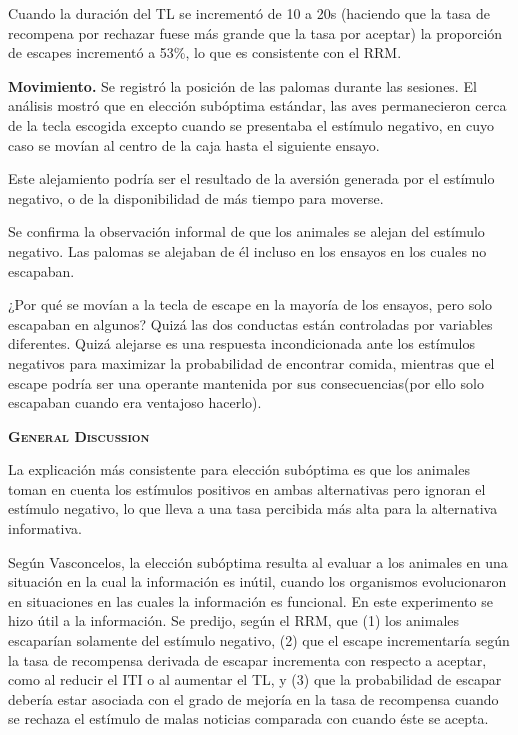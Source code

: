 \documentclass[a4paper,12pt]{article}
\begin{document}
Cuando la duración del TL se incrementó de 10 a 20s (haciendo que la tasa de recompena por rechazar fuese más grande que la tasa por aceptar) la proporción de escapes incrementó a 53\%, lo que es consistente con el RRM.

{\bfseries Movimiento.} Se registró la posición de las palomas durante las sesiones. El análisis mostró que en elección subóptima estándar, las aves permanecieron cerca de la tecla escogida excepto cuando se presentaba el estímulo  negativo, en cuyo caso se movían al centro de la caja hasta el siguiente ensayo.

Este alejamiento podría ser el resultado de la aversión generada por el estímulo negativo, o de la disponibilidad de más tiempo para moverse.

Se confirma la observación informal de que los animales se alejan del estímulo negativo. Las palomas se alejaban de él incluso en los ensayos en los cuales no escapaban.

¿Por qué se movían a la tecla de escape en la mayoría de los ensayos, pero solo escapaban en algunos? Quizá las dos conductas están controladas por variables diferentes. Quizá alejarse es una respuesta incondicionada ante los estímulos negativos para maximizar la probabilidad de encontrar comida, mientras que el escape podría ser una operante mantenida por sus consecuencias(por ello solo escapaban cuando era ventajoso hacerlo).

{\scshape\bfseries General Discussion}

La explicación más consistente para elección subóptima es que los animales toman en cuenta los estímulos positivos en ambas alternativas pero ignoran el estímulo negativo, lo que lleva a una tasa percibida más alta para la alternativa informativa.

Según Vasconcelos, la elección subóptima resulta al evaluar a los animales en una situación en la cual la información es inútil, cuando los organismos evolucionaron en situaciones en las cuales la información es funcional. En este experimento se hizo útil a la información. Se predijo, según el RRM, que (1) los animales escaparían solamente del estímulo negativo, (2) que el escape incrementaría según la tasa de recompensa derivada de escapar incrementa con respecto a aceptar, como al reducir el ITI o al aumentar el TL, y (3) que la probabilidad de escapar debería estar asociada con el grado de mejoría en la tasa de recompensa cuando se rechaza el estímulo de malas noticias comparada con cuando éste se acepta.
\end{document}
